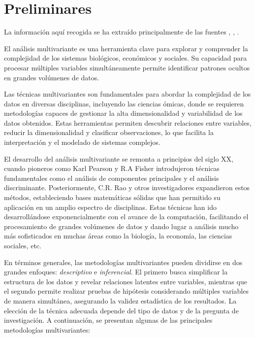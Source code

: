 \section{Preliminares}

La información aquí recogida se ha extraído principalmente de las fuentes \cite{hist-mul-1}, \cite{hist-mul-2}, \cite{Bib-1}. \newline %

El análisis multivariante es una herramienta clave para explorar y comprender la complejidad de los sistemas 
biológicos, económicos y sociales. Su capacidad para procesar múltiples variables simultáneamente permite identificar 
patrones ocultos en grandes volúmenes de datos. \newline

Las técnicas multivariantes son fundamentales para abordar la complejidad de los datos en diversas disciplinas, 
incluyendo las ciencias ómicas, donde se requieren metodologías capaces de gestionar la alta dimensionalidad y 
variabilidad de los datos obtenidos. Estas herramientas permiten descubrir relaciones entre variables, 
reducir la dimensionalidad y clasificar observaciones, lo que facilita la interpretación y el modelado de sistemas 
complejos. \newline

El desarrollo del análisis multivariante se remonta a principios del siglo XX, cuando pioneros como Karl Pearson y R.A
Fisher introdujeron técnicas fundamentales como el análisis de componentes principales y el análisis discriminante.
Posteriormente, C.R. Rao y otros investigadores expandieron estos métodos, estableciendo bases matemáticas sólidas que
han permitido su aplicación en un amplio espectro de disciplinas. Estas técnicas han ido desarrollándose exponencialmente
con el avance de la computación, facilitando el procesamiento de grandes volúmenes de datos y dando lugar a análisis 
mucho más sofisticados en muchas áreas como la biología, la economía, las ciencias sociales, etc. \newline

En términos generales, las metodologías multivariantes pueden dividirse en dos grandes enfoques: \textit{descriptivo}
e \textit{inferencial}. El primero busca simplificar la estructura de los datos y revelar relaciones latentes entre
variables, mientras que el segundo permite realizar pruebas de hipótesis considerando múltiples variables de manera
simultánea, asegurando la validez estadística de los resultados. La elección de la técnica adecuada depende del tipo 
de datos y de la pregunta de investigación. A continuación, se presentan algunas de las principales metodologías multivariantes:

